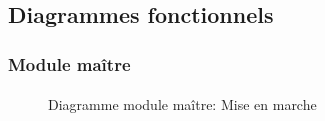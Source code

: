 \subsection{Diagrammes fonctionnels}
	\paragraph*{}
	\subsubsection{Module maître}
		\paragraph*{}
		
		\begin{figure}[H]
			\centering
			\caption{Diagramme module maître: Mise en marche}
			\label{fig:diagrammefonctionnelmiseenmarche}
		\end{figure}
		

